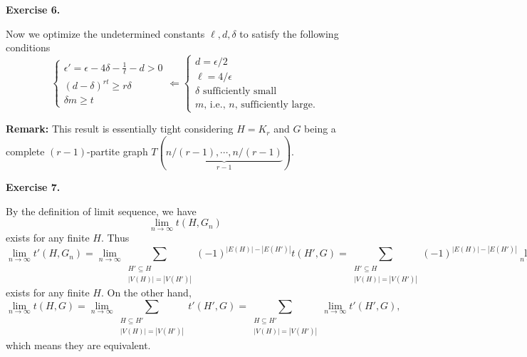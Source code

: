\documentclass[a4paper]{article}
\newenvironment{exercise}[1]{
	\par
	\noindent\textbf{Exercise #1.}\quad
}{
	\par
	\bigskip
}
\newcommand{\pbra}[1]{\left( #1 \right)}
\begin{document}
\begin{exercise}{6}
    Now we optimize the undetermined constants $\ell,d,\delta$ to satisfy the following conditions
    $$
    \begin{cases}
        \epsilon'=\epsilon-4\delta-\frac1\ell-d>0\\
        (d-\delta)^{rt}\geq r\delta\\
        \delta m\geq t
    \end{cases}
    \Leftarrow
    \begin{cases}
        d=\epsilon/2\\
        \ell=4/\epsilon\\
        \delta\text{ sufficiently small}\\
        m \text{, i.e., $n$, sufficiently large}.
    \end{cases}
    $$
\end{exercise}
\noindent\textbf{Remark:} This result is essentially tight considering $H=K_r$ and 
$G$ being a complete $(r-1)$-partite graph $T(\underbrace{n/\pbra{r-1},\cdots,n/\pbra{r-1}}_{r-1})$.

\begin{exercise}{7}
    By the definition of limit sequence, we have
    $$
    \lim_{n\to\infty}t(H,G_n)
    $$
    exists for any finite $H$. Thus
    $$
    \lim_{n\to\infty}t'(H,G_n)
    =\lim_{n\to\infty}\sum_{\substack{H'\subseteq H\\|V(H)|=|V(H')|}}(-1)^{|E(H)|-|E(H')|}t(H',G)
    =\sum_{\substack{H'\subseteq H\\|V(H)|=|V(H')|}}(-1)^{|E(H)|-|E(H')|}\lim_{n\to\infty}t(H',G)
    $$
    exists for any finite $H$.
    On the other hand,
    $$
    \lim_{n\to\infty}t(H,G)
    =\lim_{n\to\infty}\sum_{\substack{H\subseteq H'\\|V(H)|=|V(H')|}}t'(H',G)
    =\sum_{\substack{H\subseteq H'\\|V(H)|=|V(H')|}}\lim_{n\to\infty}t'(H',G),
    $$
    which means they are equivalent.
\end{exercise}
\end{document}
